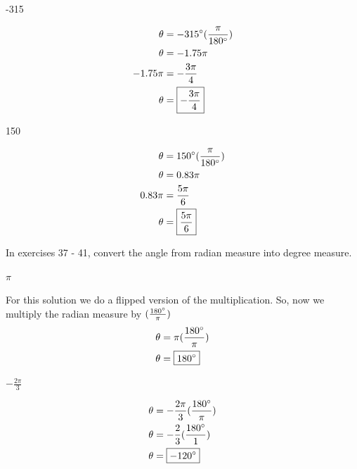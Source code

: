 \documentclass[10pt,letterpaper]{amspset}
\begin{document}
\begin{problem} [33.]
-315\degree
\end{problem}

\begin{solution}
\begin{align}
    \theta &= -315\degree (\frac{\pi}{180\degree}) \\
    \theta &= -1.75\pi \\
    -1.75\pi &= -\frac{3\pi}{4} \\
    \theta &= \boxed{-\frac{3\pi}{4}}
\end{align}
\end{solution}


\begin{problem} [34.]
150\degree
\end{problem}

\begin{solution}
\begin{align}
    \theta &= 150\degree (\frac{\pi}{180\degree}) \\
    \theta &= 0.83\pi \\
    0.83\pi &= \frac{5\pi}{6} \\
    \theta &= \boxed{\frac{5\pi}{6}}
\end{align}
\end{solution}

In exercises 37 - 41, convert the angle from radian measure into degree measure.


\begin{problem} [37.]
$\pi$
\end{problem}

\begin{solution}
For this solution we do a flipped version of the multiplication. So, now we multiply the radian measure by $(\frac{180\degree}{\pi})$
\begin{align}
    \theta &= \pi (\frac{180\degree}{\pi}) \\
    \theta &= \boxed{180\degree} \\
\end{align}
\end{solution}


\begin{problem} [38.]
$-\frac{2\pi}{3}$
\end{problem}

\begin{solution}
\begin{align}
    \theta &= -\frac{2\pi}{3} (\frac{180\degree}{\pi}) \\
    \theta &= -\frac{2}{3} (\frac{180\degree}{1}) \\
    \theta &= \boxed{-120\degree} \\
\end{align}
\end{solution}
\end{document}
